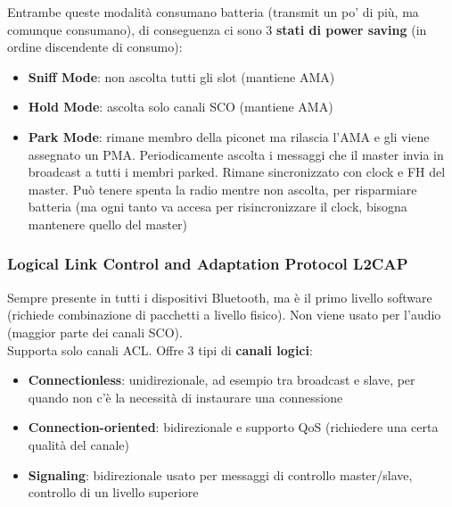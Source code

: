 Entrambe queste modalità consumano batteria (transmit un po' di più, ma comunque consumano), di conseguenza ci sono 3 \textbf{stati di power saving} (in ordine discendente di consumo): 
\begin{itemize}
\item \textbf{Sniff Mode}: non ascolta tutti gli slot (mantiene AMA)
\item \textbf{Hold Mode}: ascolta solo canali SCO (mantiene AMA)
\item \textbf{Park Mode}: rimane membro della piconet ma rilascia l'AMA e gli viene assegnato un PMA. Periodicamente ascolta i messaggi che il master invia in broadcast a tutti i membri parked. Rimane sincronizzato con clock e FH del master. Può tenere spenta la radio mentre non ascolta, per risparmiare batteria (ma ogni tanto va accesa per risincronizzare il clock, bisogna mantenere quello del master)
\end{itemize}

\newpage

\subsubsection{Logical Link Control and Adaptation Protocol L2CAP}
Sempre presente in tutti i dispositivi Bluetooth, ma è il primo livello software (richiede combinazione di pacchetti a livello fisico). Non viene usato per l'audio (maggior parte dei canali SCO).\\

Supporta solo canali ACL. Offre 3 tipi di \textbf{canali logici}:
\begin{itemize}
	\item \textbf{Connectionless}: unidirezionale, ad esempio tra broadcast e slave, per quando non c'è la necessità di instaurare una connessione
	\item \textbf{Connection-oriented}: bidirezionale e supporto QoS (richiedere una certa qualità del canale)
	\item \textbf{Signaling}: bidirezionale usato per messaggi di controllo master/slave, controllo di un livello superiore
\end{itemize}

